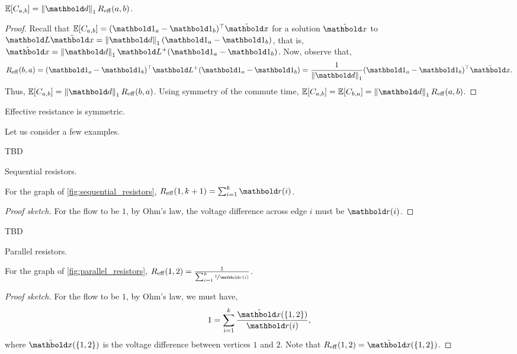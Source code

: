 \begin{lem}
$\E{C_{a,b}} = \norm{\vd}_1 \Reff(a,b)$.
\end{lem}
\begin{proof} Recall that $\E{C_{a,b}} = \trans{(\vOne_a - \vOne_b)}\ex$ for a solution $\ex$ to $\mL\ex = \norm{\vd}_1 (\vOne_a - \vOne_b)$, that is, $\ex = \norm{\vd}_1\pinv{\mL}(\vOne_a - \vOne_b)$. Now, observe that, \begin{align*}
    \Reff(b,a) = \trans{(\vOne_a - \vOne_b)}\pinv{\mL}(\vOne_a - \vOne_b) = \frac{1}{\norm{\vd}_1}\trans{(\vOne_a - \vOne_b)}\ex.
\end{align*} Thus, $\E{C_{a,b}} = \norm{\vd}_1 \Reff(b,a)$. Using symmetry of the commute time, $\E{C_{a,b}} = \E{C_{b,a}} = \norm{\vd}_1 \Reff(a,b)$.
\end{proof}

\begin{cor}\label{cor:effective_resistance_symmetric}
Effective resistance is symmetric.
\end{cor}

Let us consider a few examples.

\begin{marginfigure}
TBD
\caption{Sequential resistors.}\label{fig:sequential_resistors}
\end{marginfigure}
\begin{lem}
For the graph of \cref{fig:sequential_resistors}, $\Reff(1,k+1) = \sum_{i=1}^k \vr(i)$.
\end{lem}
\begin{proof}[Proof sketch] For the flow to be $1$, by Ohm's law, the voltage difference across edge $i$ must be $\vr(i)$.
\end{proof}

\begin{marginfigure}
TBD
\caption{Parallel resistors.}\label{fig:parallel_resistors}
\end{marginfigure}
\begin{lem}
For the graph of \cref{fig:parallel_resistors}, $\Reff(1,2) = \frac{1}{\sum_{i=1}^k \nicefrac{1}{\vr(i)}}$.
\end{lem}
\begin{proof}[Proof sketch] For the flow to be $1$, by Ohm's law, we must have, \begin{align*}
    1 = \sum_{i=1}^k \frac{\ex(\{1,2\})}{\vr(i)},
\end{align*} where $\ex(\{1,2\})$ is the voltage difference between vertices $1$ and $2$. Note that $\Reff(1,2) = \ex(\{1,2\})$.
\end{proof}


